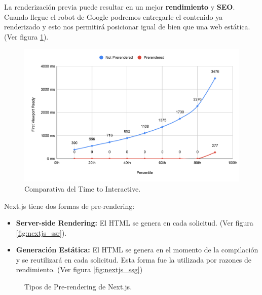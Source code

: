 \documentclass[12pt,twoside,titlepage]{report}
\begin{document}
\begin{itemize}
       La renderización previa puede resultar en un mejor \textbf{rendimiento} y \textbf{SEO}. Cuando llegue el robot de Google podremos entregarle el contenido ya renderizado y esto nos permitirá posicionar igual de bien que una web estática. (Ver figura \ref{fig:nextjs_prerenderinggraph}).

    \begin{figure}[H]
        \centering
        \includegraphics[scale=0.2]{Nextjs/PrerenderComparation}
        \caption{Comparativa del Time to Interactive.}
        \label{fig:nextjs_prerenderinggraph}
    \end{figure}
    

    Next.js tiene dos formas de pre-rendering:
    \begin{itemize}
        \item \textbf{Server-side Rendering:} El HTML se genera en cada solicitud. (Ver figura \ref{fig:nextjs_ssr}).
        \item \textbf{Generación Estática:} El HTML se genera en el momento de la compilación y se reutilizará en cada solicitud. Esta forma fue la utilizada por razones de rendimiento. (Ver figura \ref{fig:nextjs_ssg})
    \end{itemize}
    \begin{figure}[H]
        \centering
        \caption{Tipos de Pre-rendering de Next.js.}
        \label{fig:TiposPrerendering}
       \end{figure}


\end{itemize}
\end{document}
